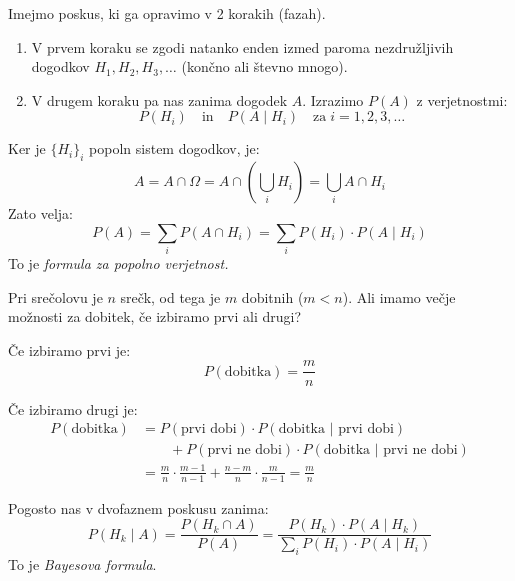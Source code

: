 \documentclass[12pt]{book}
\def\n{\noindent}
\theoremstyle{definition}
\theoremstyle{plain}
\theoremstyle{plain}
\theoremstyle{plain}
\theoremstyle{remark}
\begin{document}
\n Imejmo poskus, ki ga opravimo v 2 korakih (fazah). 

\begin{enumerate}
    \item V prvem koraku se zgodi natanko enden izmed paroma nezdružljivih dogodkov $H_1, H_2, H_3, \ldots $ (končno ali števno mnogo). 
    \item V drugem koraku pa nas zanima dogodek $A$. Izrazimo $P(A)$ z verjetnostmi: $$P\left(H_i\right) \quad \text{in} \quad P\left(A \mid H_i\right) \quad \text{za} \; i= 1, 2, 3, \ldots $$
\end{enumerate}

\n Ker je $\{ H_i \}_i$ popoln sistem dogodkov, je:
$$
A=A \cap \Omega=A \cap\left(\bigcup_i H_i\right)=\bigcup_i A \cap H_i
$$
Zato velja:
$$
P(A)=\sum_i P\left(A \cap H_i\right)=\sum_i P\left(H_i\right) \cdot P(A \mid H_i)
$$
To je \emph{formula za popolno verjetnost.}

\begin{zgled}
    Pri srečolovu je $n$ srečk, od tega je $m$ dobitnih ($m<n$). Ali imamo večje možnosti za dobitek, če izbiramo prvi ali drugi?

    Če izbiramo prvi je:
    $$
    P(\text{dobitka}) = \frac{m}{n}
    $$

    Če izbiramo drugi je:
    $$
    \begin{aligned}
        P(\text{dobitka}) &= P(\text{prvi dobi}) \cdot P(\text{dobitka | prvi dobi}) \\
        & \qquad + P(\text{prvi ne dobi}) \cdot P(\text{dobitka | prvi ne dobi}) \\
        &= \frac{m}{n} \cdot \frac{m-1}{n-1}+\frac{n-m}{n} \cdot \frac{m}{n-1} =\frac{m}{n}
    \end{aligned}
    $$
\end{zgled}

\n Pogosto nas v dvofaznem poskusu  zanima: 
$$
P\left(H_k \mid A\right)=\frac{P\left(H_k \cap A\right)}{P(A)}=\frac{P\left(H_k\right) \cdot P\left(A \mid H_k\right)}{\sum_i P\left(H_i\right) \cdot P\left(A \mid H_i\right)}
$$
To je \emph{Bayesova formula}.
\end{document}
